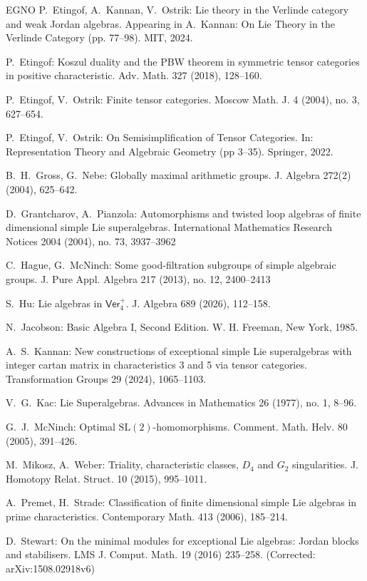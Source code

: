 \documentclass[11pt,a4paper,reqno]{amsart}
\theoremstyle{definition}
\numberwithin{equation}{section}
\newcommand{\Ver}{\mathsf{Ver}}
\newcommand{\SL}{\mathrm{SL}}
\begin{document}
\begin{thebibliography}{EGNO}
 P.~Etingof, A.~Kannan, V.~Ostrik: Lie theory in the Verlinde category and weak Jordan algebras. Appearing in A.~Kannan: On Lie Theory in the Verlinde Category (pp. 77--98). MIT, 2024.

 P.~Etingof: Koszul duality and the PBW theorem in symmetric tensor categories in positive characteristic. Adv. Math. 327 (2018), 128--160.

 P.~Etingof, V.~Ostrik: Finite tensor categories. Moscow Math. J. 4 (2004), no. 3, 627--654. 

 P.~Etingof, V.~Ostrik: On Semisimplification of Tensor Categories. In: Representation Theory and Algebraic Geometry (pp 3--35). Springer, 2022.

 B.~H.~Gross, G.~Nebe: Globally maximal arithmetic groups. J. Algebra 272(2) (2004), 625--642.

 D.~Grantcharov, A.~Pianzola: Automorphisms and twisted loop algebras of finite dimensional simple Lie superalgebras. International Mathematics Research Notices 2004 (2004), no. 73, 3937--3962

 C.~Hague, G.~McNinch: Some good-filtration subgroups of simple algebraic groups. J. Pure Appl. Algebra 217 (2013), no. 12, 2400--2413

 S.~Hu: Lie algebras in $\Ver_4^+$. J. Algebra 689 (2026), 112--158.

 N.~Jacobson: Basic Algebra I, Second Edition. W. H. Freeman, New York, 1985.

 A.~S.~Kannan: New constructions of exceptional simple Lie superalgebras with integer cartan matrix in characteristics 3 and 5 via tensor categories. Transformation Groups 29 (2024), 1065--1103.

 V.~G.~Kac: Lie Superalgebras. Advances in Mathematics 26 (1977), no. 1, 8--96.

 G.~J.~McNinch: Optimal $\SL(2)$-homomorphisms. Comment. Math. Helv. 80 (2005), 391--426.

 M.~Mikosz, A.~Weber: Triality, characteristic classes, $D_4$ and $G_2$ singularities. J. Homotopy Relat. Struct. 10 (2015), 995--1011.

 A.~Premet, H.~Strade: Classification of finite dimensional simple Lie algebras in prime characteristics. Contemporary Math. 413 (2006), 185--214.

 D.~Stewart: On the minimal modules for exceptional Lie algebras: Jordan blocks and stabilisers. LMS J. Comput. Math. 19 (2016) 235--258. (Corrected: arXiv:1508.02918v6)


\end{thebibliography}
\end{document}
